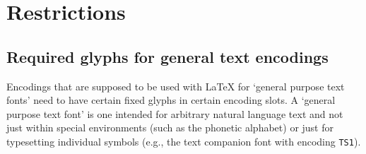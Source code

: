 \documentclass{ltxguide}[1994/11/20]
\providecommand{\Enc}[1]{\texttt{#1}}
\begin{document}
\section{Restrictions}
\label{sec:restrictions}


\subsection{Required glyphs for general text encodings}

Encodings that are supposed to be used with \LaTeX{} for `general
purpose text fonts' need to have certain fixed glyphs in certain
encoding slots.  A `general purpose text font' is one intended for
arbitrary natural language text and not just within special
environments (such as the phonetic alphabet) or just for typesetting
individual symbols (e.g., the text companion font with encoding
\Enc{TS1}).
\end{document}
